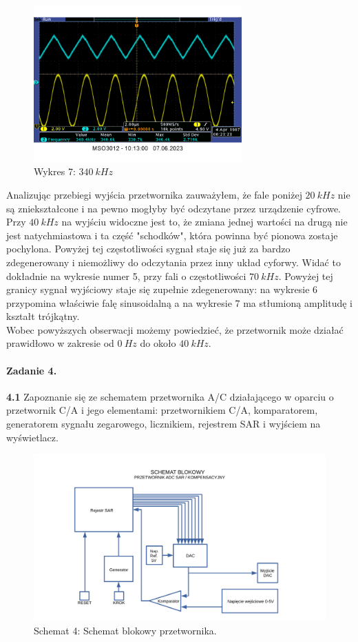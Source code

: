 \documentclass[14pt, table]{extarticle}
\begin{document}
\begin{figure}[H]
\includegraphics[width=8cm]{A3}
\centering
\captionsetup{labelformat=empty}
\caption{Wykres 7: $340 \ kHz$}
\end{figure}

Analizując przebiegi wyjścia przetwornika zauważyłem, że fale poniżej $20 \ kHz$ nie są zniekształcone i na pewno mogłyby być odczytane przez urządzenie cyfrowe. Przy $40 \ kHz$ na wyjściu widoczne jest to, że zmiana jednej wartości na drugą nie jest natychmiastowa i ta część "schodków", która powinna być pionowa zostaje pochylona. Powyżej tej częstotliwości sygnał staje się już za bardzo zdegenerowany i niemożliwy do odczytania przez inny układ cyforwy. Widać to dokładnie na wykresie numer 5, przy fali o częstotliwości $70 \ kHz$. Powyżej tej granicy sygnał wyjściowy staje się zupełnie zdegenerowany: na wykresie 6 przypomina właściwie falę sinusoidalną a na wykresie 7 ma stłumioną amplitudę i kształt trójkątny. \\

Wobec powyższych obserwacji możemy powiedzieć, że przetwornik może działać prawidłowo w zakresie od $0 \ Hz$ do około $40 \ kHz$.

\newpage
\paragraph{Zadanie 4. \\}

\textbf{4.1} Zapoznanie się ze schematem przetwornika A/C działającego w oparciu o przetwornik C/A i jego elementami: przetwornikiem C/A, komparatorem, generatorem sygnału zegarowego, licznikiem, rejestrem SAR i wyjściem na wyświetlacz.

\begin{figure}[H]
\includegraphics[width=16cm]{D3}
\centering
\captionsetup{labelformat=empty}
\caption{Schemat 4: Schemat blokowy przetwornika.}
\end{figure}
\end{document}
